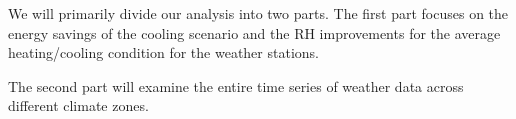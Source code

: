 We will primarily divide our analysis into two parts. The first part focuses on the energy savings of the cooling scenario and the RH improvements for the average heating/cooling condition for the weather stations. 

The second part will examine the entire time series of weather data across different climate zones. 
